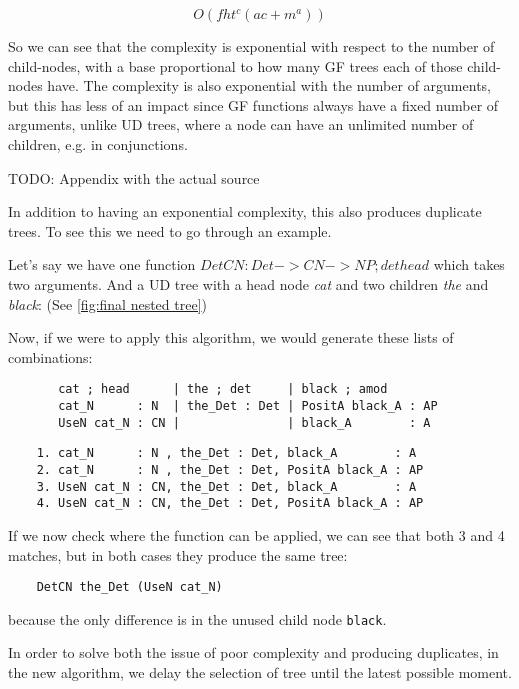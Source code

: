 $$
O(f h t^c (ac+m^a))
$$

So we can see that the complexity is exponential with respect to the number of child-nodes, with a base proportional to how many GF trees each of those child-nodes have. The complexity is also exponential with the number of arguments, but this has less of an impact since GF functions always have a fixed number of arguments, unlike UD trees, where a node can have an unlimited number of children, e.g. in conjunctions.

TODO: Appendix with the actual source

In addition to having an exponential complexity, this also produces duplicate trees. To see this we need to go through an example.

Let's say we have one function $DetCN : Det -> CN -> NP ; det head$ which takes two arguments.
And a UD tree with a head node \emph{cat} and two children \emph{the} and \emph{black}: (See \autoref{fig:final nested tree})

Now, if we were to apply this algorithm, we would generate these lists of combinations:
\begin{verbatim}
       cat ; head      | the ; det     | black ; amod
       cat_N      : N  | the_Det : Det | PositA black_A : AP
       UseN cat_N : CN |               | black_A        : A
\end{verbatim}

\begin{verbatim}
    1. cat_N      : N , the_Det : Det, black_A        : A
    2. cat_N      : N , the_Det : Det, PositA black_A : AP
    3. UseN cat_N : CN, the_Det : Det, black_A        : A
    4. UseN cat_N : CN, the_Det : Det, PositA black_A : AP
\end{verbatim}

If we now check where the function can be applied, we can see that both 3 and 4 matches,
but in both cases they produce the same tree:
\begin{verbatim}
    DetCN the_Det (UseN cat_N)
\end{verbatim}
because the only difference is in the unused child node \verb|black|.

In order to solve both the issue of poor complexity and producing duplicates, in the new algorithm, we delay the selection of tree until the latest possible moment.




